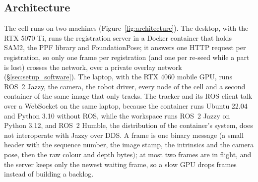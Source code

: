\subsection{Architecture}
\label{sec:impl_arch}
The cell runs on two machines (Figure~\ref{fig:architecture}). The desktop, with the RTX 5070 Ti, runs
the registration server in a Docker container that holds SAM2, the PPF library and FoundationPose; it
answers one HTTP request per registration, so only one frame per registration (and one per re-seed
while a part is lost) crosses the network, over a private overlay network (\S\ref{sec:setup_software}). The laptop, with the RTX 4060 mobile GPU, runs ROS~2 Jazzy, the camera, the robot driver,
every node of the cell and a second container of the same image that only tracks. The tracker and its
ROS client talk over a WebSocket on the same laptop, because the container runs Ubuntu 22.04 and
Python 3.10 without ROS, while the workspace runs ROS~2 Jazzy on Python 3.12, and ROS~2 Humble, the
distribution of the container's system, does not interoperate with Jazzy over DDS. A frame is one binary message (a small header with the sequence number, the
image stamp, the intrinsics and the camera pose, then the raw colour and depth bytes); at most two frames
are in flight, and the server keeps only the newest waiting frame, so a slow GPU drops frames instead of
building a backlog.

